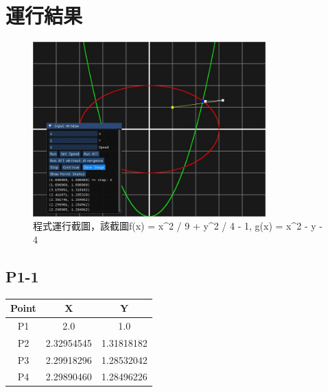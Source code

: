 \documentclass[a4paper,12pt]{article}
\begin{document}
\section{運行結果}
\begin{figure}[H]
    \centering
    \includegraphics[width=0.8\textwidth]{img/image2.jpg}
    \caption{程式運行截圖，該截圖f(x) = x^2 / 9 + y^2 / 4 - 1, g(x) = x^2 - y - 4 }
\end{figure}

\subsection{P1-1}
\begin{table}[H]
    \centering
    \begin{tabular}{|c|c|c|}
        \hline
        Point & X & Y \\
        \hline
        P1 & 2.0 & 1.0 \\
        \hline
        P2 & 2.32954545 & 1.31818182 \\
        \hline
        P3 & 2.29918296 & 1.28532042 \\
        \hline
        P4 & 2.29890460 & 1.28496226 \\
        \hline
    \end{tabular}
\end{table}
\end{document}
